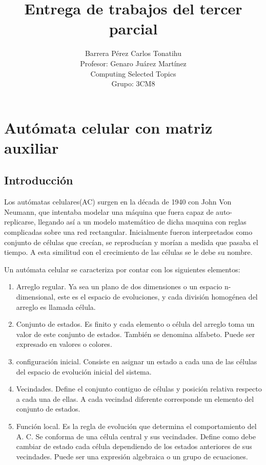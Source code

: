 \documentclass[12pt, titlepage]{article}
\title{Entrega de trabajos del tercer parcial}
\author{Barrera Pérez Carlos Tonatihu \\ Profesor: Genaro Juárez Martínez \\ Computing Selected Topics \\ Grupo: 3CM8 }
\begin{document}
\maketitle
\newpage
\tableofcontents
\newpage

\section{Autómata celular con matriz auxiliar}
\subsection{Introducción}
Los autómatas celulares(AC) surgen en la década de 1940 con John Von Neumann, que intentaba modelar una máquina que fuera capaz de auto-replicarse, llegando así a un modelo matemático de dicha maquina con reglas complicadas sobre una red rectangular. Inicialmente fueron interpretados como conjunto de células que crecían, se reproducían y morían a medida que pasaba el tiempo. A esta similitud con el crecimiento de las células se le debe su nombre.\cite{PAGINA}

Un autómata celular se caracteriza por contar con los siguientes elementos:
\begin{enumerate}
 \item Arreglo regular. Ya sea un plano de dos dimensiones o un espacio n-dimensional, este es el espacio de evoluciones, y cada división homogénea del arreglo es llamada célula.
 \item Conjunto de estados. Es finito y cada elemento o célula del arreglo toma un valor de este conjunto de estados. También se denomina alfabeto. Puede ser expresado en valores o colores.
 \item configuración inicial. Consiste en asignar un estado a cada una de las células del espacio de evolución inicial del sistema.
 \item Vecindades. Define el conjunto contiguo de células y posición relativa respecto a cada una de ellas. A cada vecindad diferente corresponde un elemento del conjunto de estados.
 \item Función local. Es la regla de evolución que determina el comportamiento del A. C. Se conforma de una célula central y sus vecindades. Define como debe cambiar de estado cada célula dependiendo de los estados anteriores de sus vecindades. Puede ser una expresión algebraica o un grupo de ecuaciones.
\end{enumerate}
\end{document}
